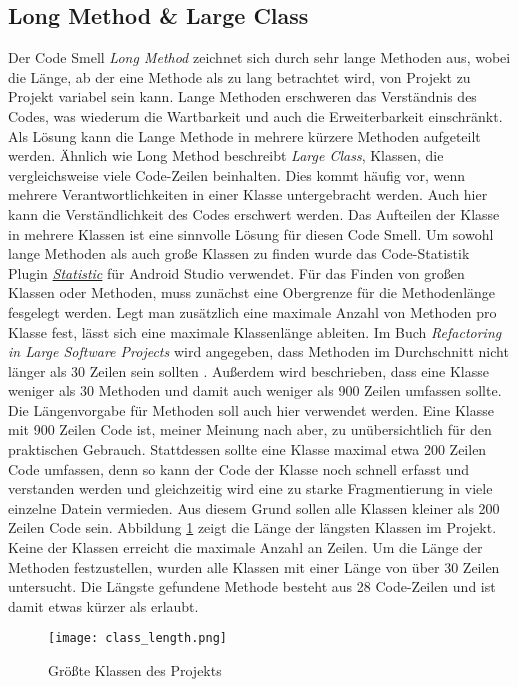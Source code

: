 \subsection{Long Method \& Large Class}

Der Code Smell \textit{Long Method} zeichnet sich durch sehr lange Methoden aus, wobei die Länge, ab der eine Methode als zu lang betrachtet wird, von Projekt zu Projekt variabel sein kann.
Lange Methoden erschweren das Verständnis des Codes, was wiederum die Wartbarkeit und auch die Erweiterbarkeit einschränkt. 
Als Lösung kann die Lange Methode in mehrere kürzere Methoden aufgeteilt werden.
\newline
\newline
Ähnlich wie Long Method beschreibt \textit{Large Class}, Klassen, die vergleichsweise viele Code-Zeilen beinhalten.
Dies kommt häufig vor, wenn mehrere Verantwortlichkeiten in einer Klasse untergebracht werden.
Auch hier kann die Verständlichkeit des Codes erschwert werden.
Das Aufteilen der Klasse in mehrere Klassen ist eine sinnvolle Lösung für diesen Code Smell.
\newline
\newline
Um sowohl lange Methoden als auch große Klassen zu finden wurde das Code-Statistik Plugin \href{https://plugins.jetbrains.com/plugin/4509-statistic}{\textit{Statistic}} für Android Studio verwendet.
Für das Finden von großen Klassen oder Methoden, muss zunächst eine Obergrenze für die Methodenlänge fesgelegt werden.
Legt man zusätzlich eine maximale Anzahl von Methoden pro Klasse fest, lässt sich eine maximale Klassenlänge ableiten.
Im Buch \textit{Refactoring in Large Software Projects} wird angegeben, dass Methoden im Durchschnitt nicht länger als 30 Zeilen sein sollten \cite[p.~31]{refactoring_lippert}.
Außerdem wird beschrieben, dass eine Klasse weniger als 30 Methoden und damit auch weniger als 900 Zeilen umfassen sollte.
Die Längenvorgabe für Methoden soll auch hier verwendet werden.
Eine Klasse mit 900 Zeilen Code ist, meiner Meinung nach aber, zu unübersichtlich für den praktischen Gebrauch.
Stattdessen sollte eine Klasse maximal etwa 200 Zeilen Code umfassen, denn so kann der Code der Klasse noch schnell erfasst und verstanden werden und gleichzeitig wird eine zu starke Fragmentierung in viele einzelne Datein vermieden.
Aus diesem Grund sollen alle Klassen kleiner als 200 Zeilen Code sein.
\newline
Abbildung \ref{fig:class_length} zeigt die Länge der längsten Klassen im Projekt.
Keine der Klassen erreicht die maximale Anzahl an Zeilen.
Um die Länge der Methoden festzustellen, wurden alle Klassen mit einer Länge von über 30 Zeilen untersucht.
Die Längste gefundene Methode besteht aus 28 Code-Zeilen und ist damit etwas kürzer als erlaubt.
\begin{figure}[h]
  \texttt{[image: class\_length.png]}
  \centering
  \caption{Größte Klassen des Projekts}
  \label{fig:class_length}
\end{figure}

